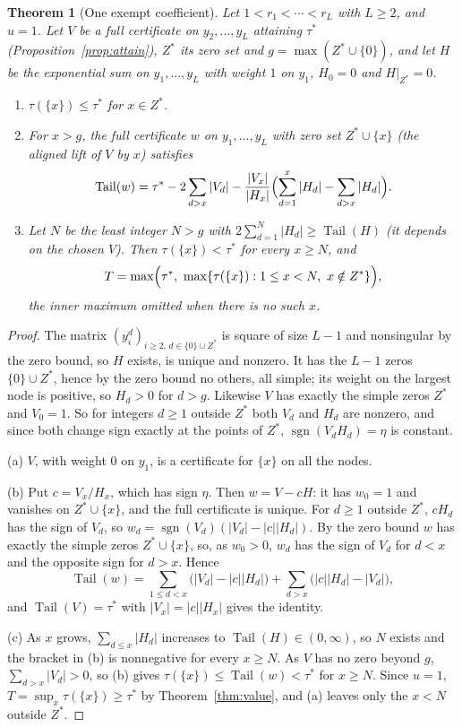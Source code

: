 \documentclass[11pt]{article}
\newtheorem{theorem}{Theorem}[section]
\theoremstyle{definition}
\theoremstyle{plain}
\DeclareMathOperator{\Tail}{Tail}
\DeclareMathOperator{\sgn}{sgn}
\begin{document}
\begin{theorem}[One exempt coefficient]\label{thm:halfmass}
Let $1<r_1<\cdots<r_L$ with $L\ge2$, and $u=1$.  Let $V$ be a full
certificate on $y_2,\ldots,y_L$ attaining $\tau^*$
(Proposition~\ref{prop:attain}), $Z^*$ its zero set and
$g=\max(Z^*\cup\{0\})$, and let $H$ be the exponential sum on
$y_1,\ldots,y_L$ with weight $1$ on $y_1$, $H_0=0$ and $H|_{Z^*}=0$.
\begin{enumerate}
\item[(a)] $\tau(\{x\})\le\tau^*$ for $x\in Z^*$.
\item[(b)] For $x>g$, the full certificate $w$ on $y_1,\ldots,y_L$ with
zero set $Z^*\cup\{x\}$ (the \emph{aligned lift} of $V$ by $x$) satisfies
\[
  \Tail(w)=\tau^*-2\sum_{d>x}|V_d|
  -\frac{|V_x|}{|H_x|}\Bigl(\sum_{d=1}^{x}|H_d|-\sum_{d>x}|H_d|\Bigr).
\]
\item[(c)] Let $N$ be the least integer $N>g$ with
$2\sum_{d=1}^N|H_d|\ge\Tail(H)$ (it depends on the chosen $V$).  Then $\tau(\{x\})<\tau^*$ for every
$x\ge N$, and
\[
  T=\max\Bigl(\tau^*,\ \max\{\tau(\{x\}):1\le x<N,\ x\notin Z^*\}\Bigr),
\]
the inner maximum omitted when there is no such $x$.
\end{enumerate}
\end{theorem}

\begin{proof}
The matrix $(y_i^d)_{i\ge2,\,d\in\{0\}\cup Z^*}$ is square of size $L-1$ and
nonsingular by the zero bound, so $H$ exists, is unique and nonzero.  It has
the $L-1$ zeros $\{0\}\cup Z^*$, hence by the zero bound no others, all
simple; its weight on the largest node is positive, so $H_d>0$ for $d>g$.
Likewise $V$ has exactly the simple zeros $Z^*$ and $V_0=1$.  So for
integers $d\ge1$ outside $Z^*$ both $V_d$ and $H_d$ are nonzero, and since
both change sign exactly at the points of $Z^*$, $\sgn(V_dH_d)=\eta$ is
constant.

(a) $V$, with weight $0$ on $y_1$, is a certificate for $\{x\}$ on all the
nodes.

(b) Put $c=V_x/H_x$, which has sign $\eta$.  Then $w=V-cH$: it has
$w_0=1$ and vanishes on $Z^*\cup\{x\}$, and the full certificate is unique.
For $d\ge1$ outside $Z^*$, $cH_d$ has the sign of $V_d$, so
$w_d=\sgn(V_d)(|V_d|-|c||H_d|)$.  By the zero bound $w$ has exactly the
simple zeros $Z^*\cup\{x\}$, so, as $w_0>0$, $w_d$ has the sign of $V_d$ for
$d<x$ and the opposite sign for $d>x$.  Hence
\[
  \Tail(w)=\sum_{1\le d<x}\bigl(|V_d|-|c||H_d|\bigr)
  +\sum_{d>x}\bigl(|c||H_d|-|V_d|\bigr),
\]
and $\Tail(V)=\tau^*$ with $|V_x|=|c||H_x|$ gives the identity.

(c) As $x$ grows, $\sum_{d\le x}|H_d|$ increases to $\Tail(H)\in(0,\infty)$,
so $N$ exists and the bracket in (b) is nonnegative for every $x\ge N$.  As
$V$ has no zero beyond $g$, $\sum_{d>x}|V_d|>0$, so (b) gives
$\tau(\{x\})\le\Tail(w)<\tau^*$ for $x\ge N$.  Since $u=1$,
$T=\sup_x\tau(\{x\})\ge\tau^*$ by Theorem~\ref{thm:value}, and (a) leaves
only the $x<N$ outside $Z^*$.
\end{proof}
\end{document}

